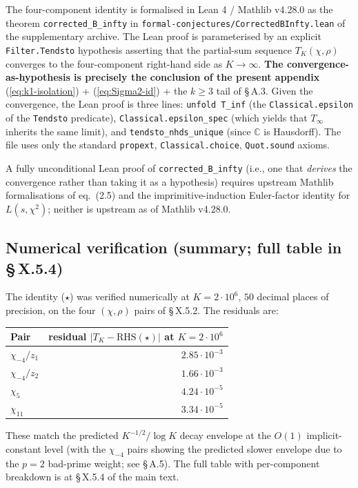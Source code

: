 The four-component identity is formalised in Lean 4 / Mathlib v4.28.0
as the theorem \texttt{corrected\_B\_infty} in
\texttt{formal-conjectures/CorrectedBInfty.lean} of the supplementary
archive. The Lean proof is parameterised by an explicit
\texttt{Filter.Tendsto} hypothesis asserting that the partial-sum sequence
\(T_K(\chi,\rho)\) converges to the four-component right-hand side as
\(K \to \infty\). \textbf{The convergence-as-hypothesis is precisely the
conclusion of the present appendix} (\ref{eq:k1-isolation}) +
(\ref{eq:Sigma2-id}) + the \(k \ge 3\) tail of \S\,A.3. Given the
convergence, the Lean proof is three lines: \texttt{unfold\ T\_inf} (the
\texttt{Classical.epsilon} of the \texttt{Tendsto} predicate),
\texttt{Classical.epsilon\_spec} (which yields that \(T_\infty\) inherits the
same limit), and \texttt{tendsto\_nhds\_unique} (since \(\mathbb{C}\) is
Hausdorff). The file uses only the standard
\texttt{propext}, \texttt{Classical.choice}, \texttt{Quot.sound} axioms.

A fully unconditional Lean proof of \texttt{corrected\_B\_infty} (i.e., one
that \emph{derives} the convergence rather than taking it as a hypothesis)
requires upstream Mathlib formalisations of \cite{AkatsukaH2013EulerProduct}
eq.~(2.5) and the imprimitive-induction Euler-factor identity for
\(L(s, \chi^2)\); neither is upstream as of Mathlib v4.28.0.

\subsection{Numerical verification (summary; full table in \S\,X.5.4)}

The identity (\(\star\)) was verified numerically at \(K = 2 \cdot 10^6\),
\(50\) decimal places of precision, on the four
\((\chi, \rho)\) pairs of \S\,X.5.2. The residuals are:

{\def\LTcaptype{none} %
\begin{longtable}[]{@{}lr@{}}
\toprule\noalign{}
Pair & residual \(|T_K - \mathrm{RHS}(\star)|\) at \(K = 2\cdot 10^6\) \\
\midrule\noalign{}
\endhead
\bottomrule\noalign{}
\endlastfoot
\(\chi_{-4}/z_1\) & \(2.85 \cdot 10^{-3}\) \\
\(\chi_{-4}/z_2\) & \(1.66 \cdot 10^{-3}\) \\
\(\chi_5\) & \(4.24 \cdot 10^{-5}\) \\
\(\chi_{11}\) & \(3.34 \cdot 10^{-5}\) \\
\end{longtable}
}

These match the predicted \(K^{-1/2}/\log K\) decay envelope at the
\(O(1)\) implicit-constant level (with the \(\chi_{-4}\) pairs showing the
predicted slower envelope due to the \(p=2\) bad-prime weight; see \S\,A.5).
The full table with per-component breakdown is at \S\,X.5.4 of the main
text.
